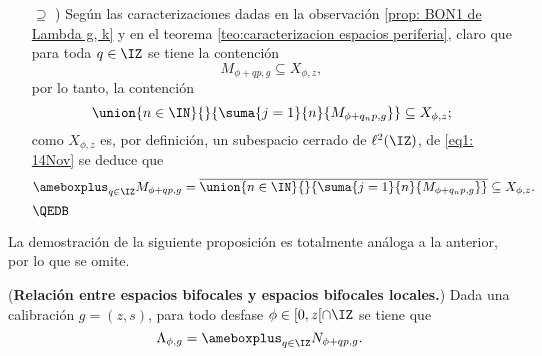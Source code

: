 \begin{dem}
\begin{itemize}
\item[$\supseteq$ )] 
Según las caracterizaciones dadas en 
la observación 
\ref{prop: BON1 de Lambda g, k}
y en el teorema
\ref{teo:caracterizacion espacios periferia}, 
claro que
para toda $q \in \IZ$ se tiene la contención
\[
M_{\phi + q p, g} \subseteq X_{\phi, z},
\]
por lo tanto, la contención
\begin{equation}
\label{eq1: 14Nov}
\union{n \in \IN}{}{\suma{j=1}{n}{M_{\phi+q_{n}p, g}}}
\subseteq X_{\phi, z};
\end{equation}
como $X_{\phi, z}$ es, por definición, un subespacio
cerrado de $\ell^{2}(\IZ)$, de
\eqref{eq1: 14Nov} se deduce que
\[
\ameboxplus_{q \in \IZ} M_{\phi +qp,g}
=
\overline{\union{n \in \IN}{}{\suma{j=1}{n}{M_{\phi+q_{n}p, g}}}}
\subseteq X_{\phi, z}.
\]
$\QEDB$
\end{itemize}
\end{dem} 

La demostración de la siguiente proposición
es totalmente análoga a la anterior, por lo que se omite.
\begin{prop}
(\textbf{Relación entre espacios bifocales y espacios
bifocales locales.})
Dada una calibración $g=(z,s)$, para todo 
desfase $\phi \in [0, z[ \cap \IZ$ se tiene que  
\[
\Lambda_{\phi, g}= \ameboxplus_{q \in \IZ} N_{\phi +qp,g}.
\]
\end{prop}


